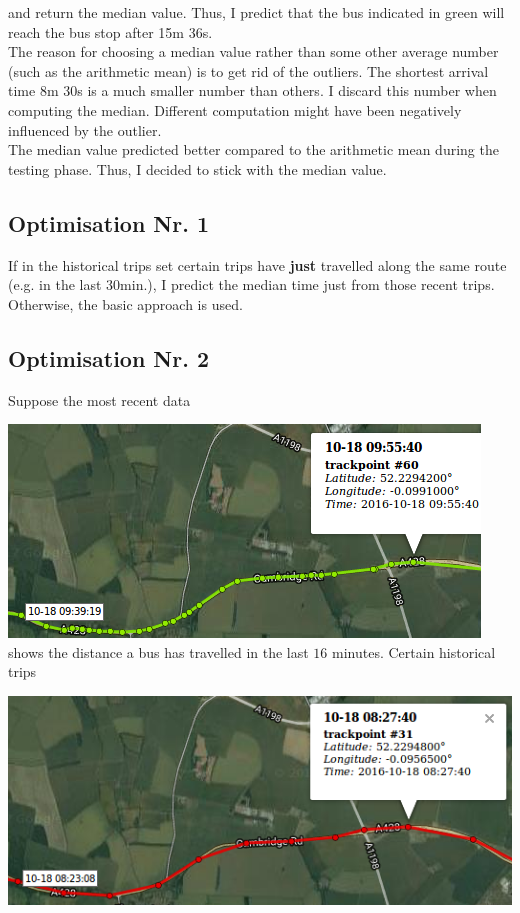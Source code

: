 \documentclass[12pt,a4paper,oneside,openright]{report}
\begin{document}
\:
\:

and return the median value. Thus, I predict that the bus indicated in green will
reach the bus stop after 15m 36s. \\

The reason for choosing a median value rather than some other average number
(such as the arithmetic mean) is to get rid of the outliers. The shortest arrival time
8m 30s is a much smaller number than others. I discard this number when computing
the median. Different computation might have been negatively influenced by the outlier. \\

The median value predicted better compared to the arithmetic mean during the testing
phase. Thus, I decided to stick with the median value.

\subsection{Optimisation Nr. 1}

If in the historical trips set certain trips have \textbf{just} travelled along
the same route (e.g. in the last $30$min.), I predict the median time just from
those recent trips. Otherwise, the basic approach is used.

\subsection{Optimisation Nr. 2}

Suppose the most recent data

\includegraphics[scale = 0.7]{figs/recent_trip.png} \\

shows the distance a bus has travelled in the last $16$ minutes. Certain historical
trips

\includegraphics[scale = 0.7]{figs/inaccurate_historical.png} \\
\end{document}
